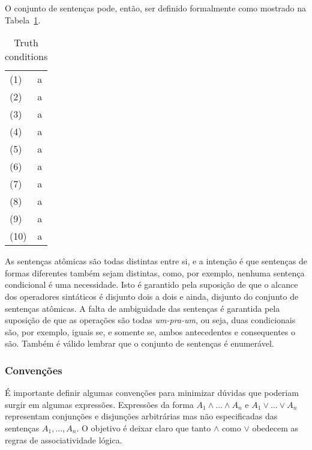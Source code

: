 O conjunto de sentenças pode, então, ser definido formalmente como mostrado na
Tabela~\ref{table:sentences}.

\begin{center}
    \begin{table}[h!]
\label{table:sentences}
    \caption{Truth conditions}

    \begin{tabular}{ll}
        \vspace{2mm}
        (1) & a \\
        \vspace{2mm}
        (2)  & a \\
        \vspace{2mm}
        (3)  & a \\
        \vspace{2mm}
        (4)  &a \\
        \vspace{2mm}
        (5)  & a \\
        \vspace{2mm}
        (6)  &a \\
        \vspace{2mm}
        (7)  &a \\
        \vspace{2mm}
        (8)  &a \\
        \vspace{2mm}
        (9)  &a \\
        \vspace{2mm}
        (10) &a
    \end{tabular}
\end{table}
\end{center}

As sentenças at\^omicas são todas distintas entre si, e a intenção é que sentenças
de formas diferentes também sejam distintas, como, por exemplo, nenhuma sentença
condicional é uma necessidade. Isto é garantido pela suposição de que o alcance
dos operadores sintáticos é disjunto dois a dois e ainda, disjunto do conjunto
de sentenças at\^omicas.
A falta de ambiguidade das sentenças é garantida pela suposição de que as
operações são todas \textit{um-pra-um}, ou seja, duas condicionais são, por
exemplo, iguais se, e somente se, ambos antecedentes e consequentes o são.
Também é válido lembrar que o conjunto de sentenças é enumerável.

\subsubsection{Convenções} 
É importante definir algumas convenções para minimizar 
dúvidas que poderiam surgir em algumas expressões.
Expressões da forma $A_1 \wedge \ldots \wedge A_n$ e $A_1 \vee \ldots \vee A_n$
representam conjunções e disjunções arbitrárias mas não especificadas das
sentenças $A_1,\ldots,A_n$. O objetivo é deixar claro que tanto $\wedge$ como
$\vee$ obedecem as regras de associatividade lógica. 

